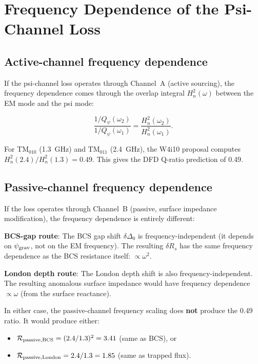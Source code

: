 \documentclass[11pt]{article}
\newcommand{\Qpsi}{Q_\psi}
\newcommand{\Heff}{H_n}
\newcommand{\psigrav}{\psi_{\rm grav}}
\theoremstyle{definition}
\theoremstyle{remark}
\begin{document}
\section{Frequency Dependence of the Psi-Channel Loss}
\label{sec:frequency}

\subsection{Active-channel frequency dependence}

If the psi-channel loss operates through Channel~A (active sourcing),
the frequency dependence comes through the overlap integral
$\Heff^2(\omega)$ between the EM mode and the psi mode:

\begin{equation}
\frac{1/\Qpsi(\omega_2)}{1/\Qpsi(\omega_1)}
= \frac{\Heff^2(\omega_2)}{\Heff^2(\omega_1)}.
\label{eq:active_ratio}
\end{equation}

For TM$_{010}$ (1.3~GHz) and TM$_{011}$ (2.4~GHz), the W4i10 proposal
computes $\Heff^2(2.4)/\Heff^2(1.3) = 0.49$. This gives the DFD
Q-ratio prediction of 0.49.

\subsection{Passive-channel frequency dependence}

If the loss operates through Channel~B (passive, surface impedance
modification), the frequency dependence is entirely different:

\textbf{BCS-gap route}: The BCS gap shift $\delta\Delta_0$ is
frequency-independent (it depends on $\psigrav$, not on the EM
frequency). The resulting $\delta R_s$ has the same frequency
dependence as the BCS resistance itself: $\propto \omega^2$.

\textbf{London depth route}: The London depth shift is also
frequency-independent. The resulting anomalous surface impedance
would have frequency dependence $\propto \omega$ (from the surface
reactance).

In either case, the passive-channel frequency scaling does \textbf{not}
produce the 0.49 ratio. It would produce either:
\begin{itemize}[nosep]
\item $\mathcal{R}_{\rm passive,BCS} = (2.4/1.3)^2 = 3.41$
  (same as BCS), or
\item $\mathcal{R}_{\rm passive,London} = 2.4/1.3 = 1.85$
  (same as trapped flux).
\end{itemize}
\end{document}
